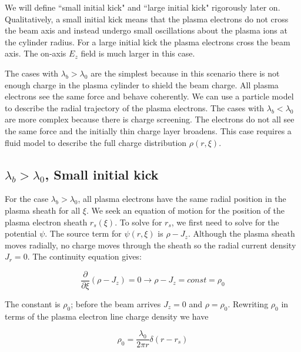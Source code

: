 \documentclass[aps,prl,preprint,groupedaddress]{revtex4-1}
\begin{document}
We will define ``small initial kick" and ``large initial kick" rigorously later on. Qualitatively, a small initial kick means that the plasma electrons do not cross the beam axis and instead undergo small oscillations about the plasma ions at the cylinder radius. For a large initial kick the plasma electrons cross the beam axis. The on-axis $E_z$ field is much larger in this case.

The cases with $\lambda_b > \lambda_0$ are the simplest because in this scenario there is not enough charge in the plasma cylinder to shield the beam charge. All plasma electrons see the same force and behave coherently. We can use a particle model to describe the radial trajectory of the plasma electrons. The cases with $\lambda_b < \lambda_0$ are more complex because there is charge screening. The electrons do not all see the same force and the initially thin charge layer broadens. This case requires a fluid model to describe the full charge distribution $\rho(r,\xi)$.







\subsection{$\lambda_b > \lambda_0$, Small initial kick}

For the case $\lambda_b > \lambda_0$, all plasma electrons have the same radial position in the plasma sheath for all $\xi$. We seek an equation of motion for the position of the plasma electron sheath $r_s(\xi)$. To solve for $r_s$, we first need to solve for the potential $\psi$. The source term for $\psi(r,\xi)$ is $\rho - J_z$. Although the plasma sheath moves radially, no charge moves through the sheath so the radial current density $J_r = 0$. The continuity equation gives:

\begin{equation}\label{eq:cont2}
\frac{\partial}{\partial \xi}(\rho - J_z) = 0 \rightarrow \rho - J_z = const = \rho_0 
\end{equation}

The constant is $\rho_0$; before the beam arrives $J_z = 0$ and $\rho = \rho_0$. Rewriting $\rho_0$ in terms of the plasma electron line charge density we have

\begin{equation}\label{eq:rho_for_lamb}
\rho_0 = \frac{\lambda_0}{2 \pi r}\delta(r - r_s)
\end{equation}
\end{document}
